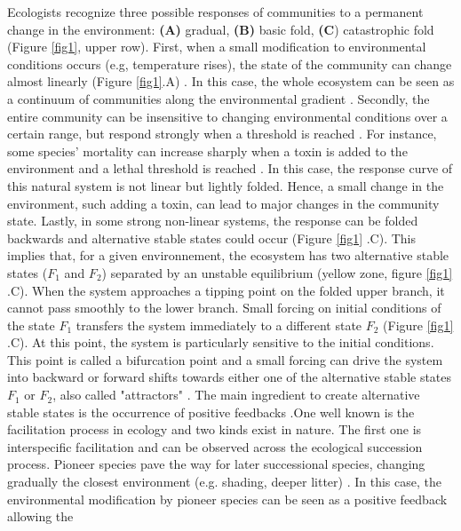 Ecologists recognize three possible responses of communities to a permanent
change in the environment: \textbf{(A)} gradual, \textbf{(B)} basic fold,
\textbf{(C}) catastrophic fold \cite{Scheffer2001} (Figure \ref{fig1}, upper
row). First, when a small modification to environmental conditions occurs (e.g,
temperature rises), the state of the community can change almost linearly
(Figure \ref{fig1}.A) \cite{Scheffer2001,Scheffer2009}. In this case, the whole
ecosystem can be seen as a continuum of communities along the environmental
gradient \cite{Scheffer2001,Scheffer2009,scheffer2009critical}. Secondly, the
entire community can be insensitive to changing environmental conditions over a
certain range, but respond strongly when a threshold is reached
\cite{scheffer2009critical}. For instance, some species' mortality can increase
sharply when a toxin is added to the environment and a lethal threshold is
reached \cite{scheffer2009critical}. In this case, the response curve of this
natural system is not linear but lightly folded. Hence, a small change in the
environment, such adding a toxin, can lead to major changes in the  community
state. Lastly, in some strong non-linear systems, the response can be folded
backwards and alternative stable states could occur (Figure \ref{fig1} .C). This
implies that, for a given environnement, the ecosystem has two alternative
stable states ($F_1$ and $F_2$) separated by an unstable equilibrium (yellow
zone, figure \ref{fig1} .C). When the system approaches a tipping point on the
folded upper branch, it cannot pass smoothly to the lower branch. Small forcing
on initial conditions of the state $F_1$ transfers the system immediately to a
different state $F_2$ (Figure \ref{fig1} .C). At this point, the system is
particularly sensitive to the initial conditions. This point is called a
bifurcation point and a small forcing can drive the system into backward or
forward shifts towards either one of the alternative stable states $F_1$ or
$F_2$, also called "attractors" \cite{scheffer2009critical}. The main ingredient
to create alternative stable states is the occurrence of positive feedbacks
\cite{scheffer2009critical,Schroder2005}.One well known is the facilitation
process in ecology and two kinds exist in nature. The first one is interspecific
facilitation and can be observed across the ecological succession process.
Pioneer species pave the way for later successional species, changing gradually
the closest environment (e.g. shading, deeper litter)
\cite{scheffer2009critical, Levine2006}. In this case, the environmental
modification by pioneer species can be seen as a positive feedback allowing the
